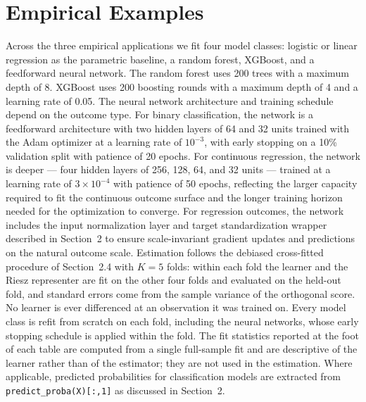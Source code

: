 \documentclass[12pt]{article}
\begin{document}
	\section{Empirical Examples}
	
	Across the three empirical applications we fit four model classes: logistic or linear regression as the parametric baseline, a random forest, XGBoost, and a feedforward neural network. The random forest uses 200 trees with a maximum depth of 8. XGBoost uses 200 boosting rounds with a maximum depth of 4 and a learning rate of 0.05. The neural network architecture and training schedule depend on the outcome type. For binary classification, the network is a feedforward architecture with two hidden layers of 64 and 32 units trained with the Adam optimizer at a learning rate of $10^{-3}$, with early stopping on a 10\% validation split with patience of 20 epochs. For continuous regression, the network is deeper --- four hidden layers of 256, 128, 64, and 32 units --- trained at a learning rate of $3 \times 10^{-4}$ with patience of 50 epochs, reflecting the larger capacity required to fit the continuous outcome surface and the longer training horizon needed for the optimization to converge. For regression outcomes, the network includes the input normalization layer and target standardization wrapper described in Section~2 to ensure scale-invariant gradient updates and predictions on the natural outcome scale. Estimation follows the debiased cross-fitted procedure of Section~2.4 with $K=5$ folds: within each fold the learner and the Riesz representer are fit on the other four folds and evaluated on the held-out fold, and standard errors come from the sample variance of the orthogonal score. No learner is ever differenced at an observation it was trained on. Every model class is refit from scratch on each fold, including the neural networks, whose early stopping schedule is applied within the fold. The fit statistics reported at the foot of each table are computed from a single full-sample fit and are descriptive of the learner rather than of the estimator; they are not used in the estimation. Where applicable, predicted probabilities for classification models are extracted from \texttt{predict\_proba(X)[:,1]} as discussed in Section~2.
\end{document}
